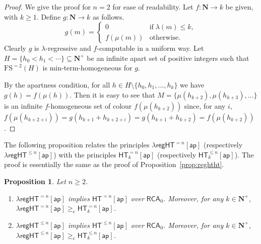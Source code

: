 \documentclass[a4paper,11pt]{article}
\newtheorem{proposition}{Proposition}
\newcommand\Nat{\mathbf{N}}
\newcommand\RCA{\mathsf{RCA}}
\newcommand\HT{\mathsf{HT}}
\newcommand\regHT{\mathsf{regHT}}
\newcommand\FS{\mathrm{FS}}
\newcommand\compred{\mathrm{c}}
\newcommand\ap{\mathsf{ap}}
\begin{document}
\begin{proof}
We give the proof for $n=2$ for ease of readability. Let $f:\Nat \to k$ be given, with $k \geq 1$. Define $g:\Nat \to k$ as follows.
$$
    g(m) =
    \begin{cases}
      0 & \mathrm{if} \; \lambda(m) \leq k, \\
      f(\mu(m))	&	\text{otherwise.}
    \end{cases}
$$
Clearly $g$ is $\lambda$-regressive and $f$-computable in a uniform way. 
Let $H=\{h_0 < h_1 < \cdots\}\subseteq\Nat^+$ be an infinite apart set of positive integers such that $\FS^{=2}(H)$ is min-term-homogeneous for $g$.

By the apartness condition, for all $h \in H\setminus \{h_0, h_1, \ldots,h_k\}$ we have $g(h) = f(\mu(h))$. Then it is easy to see that $M=\{\mu(h_{k+2}),\mu(h_{k+3}),\ldots\}$ is an infinite $f$-homogeneous set of colour $f(\mu(h_{k+2}))$ since, for any $i$, $f(\mu(h_{k+2+i})) = g(h_{k+1}+h_{k+2+i}) = g(h_{k+1}+h_{k+2}) = f(\mu(h_{k+2}))$.
\end{proof}


The following proposition relates the principles $\lambda\regHT^{= n}[\ap]$ (respectively $\lambda\regHT^{\leq n}[\ap]$) with the principles $\HT^{= n}_k[\ap]$ (respectively $\HT^{\leq n}_k[\ap]$). 
The proof is essentially the same as the proof of Proposition~\ref{prop:reghtht}. 

\begin{proposition}\label{prop:regHTtoHTeqn}
Let $n\geq 2$. 
\begin{enumerate}
\item $\lambda\regHT^{= n}[\ap]$ implies $\HT^{= n}[\ap]$ over $\RCA_0$. Moreover, for any $k\in\Nat^+$, $\lambda\regHT^{= n}[\ap] \geq_\mathrm{c}  \HT^{= n}_k[\ap]$.
\item $\lambda\regHT^{\leq n}[\ap]$ implies $\HT^{\leq n}[\ap]$ over $\RCA_0$. Moreover, for any $k\in\Nat^+$, $\lambda\regHT^{\leq n}[\ap] \geq_\compred  \HT^{\leq n}_k[\ap]$.
\end{enumerate}
\end{proposition}
\end{document}
